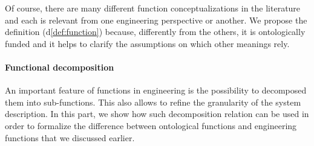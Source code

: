 \documentclass[sw]{iosart2x}
\newcommand{\DefLabel}{\textrm{d}}
\newcommand{\refdf}[1]{({\DefLabel}\ref{#1})}
\newcommand{\TODO}[1]{{\color{red} #1}}
\begin{document}
Of course, there are many different function conceptualizations in the literature and each is relevant from one engineering perspective or another. We propose the definition \refdf{def:function} because, differently from the others, it is ontologically funded and it helps to clarify the assumptions on which other meanings rely.

\paragraph{Functional decomposition}
An important feature of functions in engineering is the possibility to decomposed them into sub-functions. This also allows to refine the granularity of the system description. In this part, we show how such decomposition relation can be used in order to formalize the difference between ontological functions and engineering functions that we discussed earlier.
\end{document}
